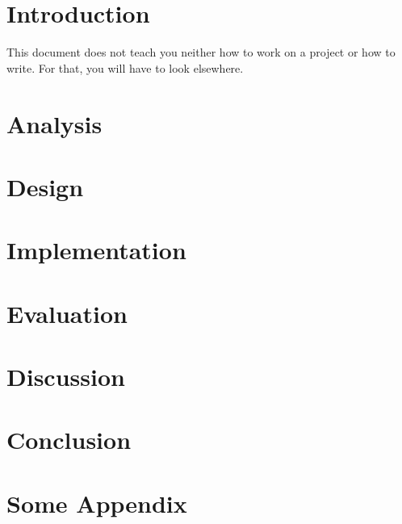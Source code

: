 \documentclass[a4paper, oneside]{memoir}
\begin{document}
\maketitle
\setcounter{tocdepth}{2}
\tableofcontents
\newpage
\listoffigures

\chapter{Introduction}

This document does not teach you neither how to work on a project or how to write. For that, you will have to look elsewhere\cite{reportwriting}.

\chapter{Analysis}
\chapter{Design}
\chapter{Implementation}
\chapter{Evaluation}
\chapter{Discussion}
\chapter{Conclusion}

\appendix
\chapter{Some Appendix}
\printbibliography
\end{document}

